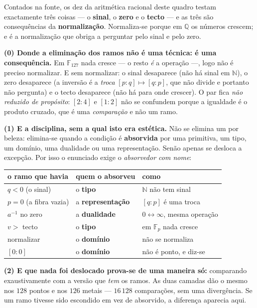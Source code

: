 \documentclass[livro.tex]{subfiles}
\begin{document}
\begin{teorema}\label{thm:sem-ramo}
Contados na fonte, os dez  da aritmética racional deste quadro
testam exactamente três coisas --- o \textbf{sinal}, o \textbf{zero} e o
\textbf{tecto} --- e as três são consequências da \textbf{normalização}.
Normaliza-se porque em $\mathbb{Q}$ os números crescem; e é a
normalização que obriga a perguntar pelo sinal e pelo zero.

\textbf{(0) Donde a eliminação dos ramos não é uma técnica: é uma
consequência.} Em $\mathbb{F}_{127}$ nada cresce --- o resto \emph{é} a
operação ---, logo não é preciso normalizar. E sem normalizar: o sinal
desaparece (não há sinal em $\mathbb{N}$), o zero desaparece (a inversão
é a \emph{troca} $[p:q]\mapsto[q:p]$, que não divide e portanto não
pergunta) e o tecto desaparece (não há para onde crescer). O par fica
\emph{não reduzido de propósito}: $[2{:}4]$ e $[1{:}2]$ não se confundem
porque a igualdade é o produto cruzado, que é uma \emph{comparação} e não
um ramo.

\textbf{(1) E a disciplina, sem a qual isto era estética.} Não se elimina
um  por beleza: elimina-se quando a condição é \textbf{absorvida}
por uma primitiva, um tipo, um domínio, uma dualidade ou uma
representação. Senão apenas se desloca a excepção. Por isso o enunciado
exige o \emph{absorvedor com nome}:
\begin{center}\small
\begin{tabular}{@{}lll@{}}
\toprule
o ramo que havia & quem o absorveu & como \\
\midrule
$q<0$ (o sinal) & o \textbf{tipo} & $\mathbb{N}$ não tem sinal \\
$p=0$ (a fibra vazia) & a \textbf{representação} & $[q{:}p]$ é uma troca \\
$a^{-1}$ no zero & a \textbf{dualidade} & $0\leftrightarrow\infty$, mesma operação \\
$v>$ tecto & o \textbf{tipo} & em $\mathbb{F}_p$ nada cresce \\
normalizar & o \textbf{domínio} & não se normaliza \\
$[0{:}0]$ & o \textbf{domínio} & não é ponto, e diz-se \\
\bottomrule
\end{tabular}
\end{center}

\textbf{(2) E que nada foi deslocado prova-se de uma maneira só:}
comparando exaustivamente com a versão que \emph{tem} os ramos. As duas
camadas dão o mesmo nos $128$ pontos e nos $126$ metais --- $16\,128$
comparações, sem uma divergência. Se um ramo tivesse sido escondido em
vez de absorvido, a diferença aparecia aqui.


\end{teorema}
\end{document}
